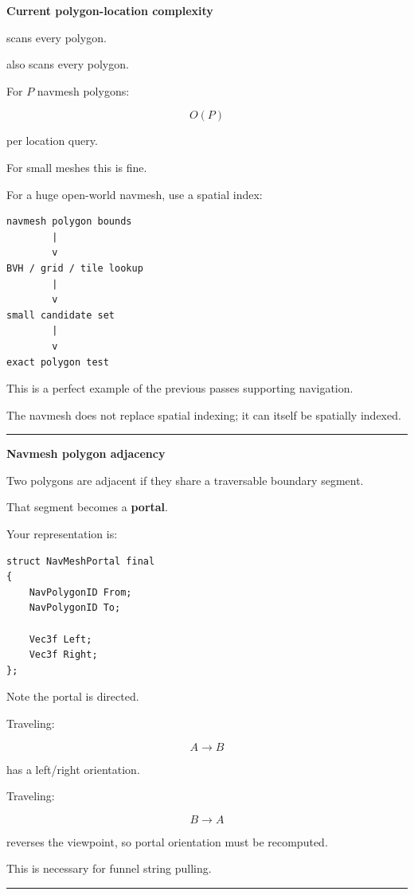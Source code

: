 \textbf{Current polygon-location complexity}

 scans every polygon.

 also scans every polygon.

For \(P\) navmesh polygons:

\[
O(P)
\]

per location query.

For small meshes this is fine.

For a huge open-world navmesh, use a spatial index:

\begin{verbatim}
navmesh polygon bounds
        |
        v
BVH / grid / tile lookup
        |
        v
small candidate set
        |
        v
exact polygon test
\end{verbatim}

This is a perfect example of the previous passes supporting navigation.

The navmesh does not replace spatial indexing; it can itself be spatially indexed.

\begin{center}\rule{0.5\linewidth}{0.5pt}\end{center}

\textbf{Navmesh polygon adjacency}

Two polygons are adjacent if they share a traversable boundary segment.

That segment becomes a \textbf{portal}.

Your representation is:

\begin{verbatim}
struct NavMeshPortal final
{
    NavPolygonID From;
    NavPolygonID To;

    Vec3f Left;
    Vec3f Right;
};
\end{verbatim}

Note the portal is directed.

Traveling:

\[
A\rightarrow B
\]

has a left/right orientation.

Traveling:

\[
B\rightarrow A
\]

reverses the viewpoint, so portal orientation must be recomputed.

This is necessary for funnel string pulling.

\begin{center}\rule{0.5\linewidth}{0.5pt}\end{center}

